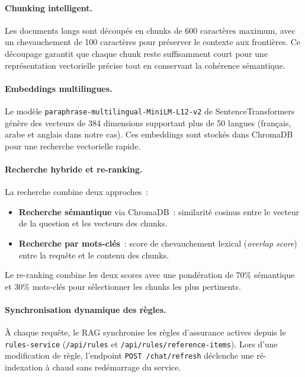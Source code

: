 \paragraph{Chunking intelligent.}
Les documents longs sont d\'{e}coup\'{e}s en chunks de 600 caract\`{e}res maximum, avec un chevauchement de 100 caract\`{e}res pour pr\'{e}server le contexte aux fronti\`{e}res. Ce d\'{e}coupage garantit que chaque chunk reste suffisamment court pour une repr\'{e}sentation vectorielle pr\'{e}cise tout en conservant la coh\'{e}rence s\'{e}mantique.

\paragraph{Embeddings multilingues.}
Le mod\`{e}le \texttt{paraphrase-multilingual-MiniLM-L12-v2} de SentenceTransformers g\'{e}n\`{e}re des vecteurs de 384 dimensions supportant plus de 50 langues (fran\c{c}ais, arabe et anglais dans notre cas). Ces embeddings sont stock\'{e}s dans ChromaDB pour une recherche vectorielle rapide.

\paragraph{Recherche hybride et re-ranking.}
La recherche combine deux approches~:
\begin{itemize}
    \item \textbf{Recherche s\'{e}mantique} via ChromaDB~: similarit\'{e} cosinus entre le vecteur de la question et les vecteurs des chunks.
    \item \textbf{Recherche par mots-cl\'{e}s}~: score de chevauchement lexical (\textit{overlap score}) entre la requ\^{e}te et le contenu des chunks.
\end{itemize}
Le re-ranking combine les deux scores avec une pond\'{e}ration de 70\% s\'{e}mantique et 30\% mots-cl\'{e}s pour s\'{e}lectionner les chunks les plus pertinents.

\paragraph{Synchronisation dynamique des r\`{e}gles.}
\`{A} chaque requ\^{e}te, le RAG synchronise les r\`{e}gles d'assurance actives depuis le \texttt{rules-service} (\texttt{/api/rules} et \texttt{/api/rules/reference-items}). Lors d'une modification de r\`{e}gle, l'endpoint \texttt{POST /chat/refresh} d\'{e}clenche une r\'{e}-indexation \`{a} chaud sans red\'{e}marrage du service.

